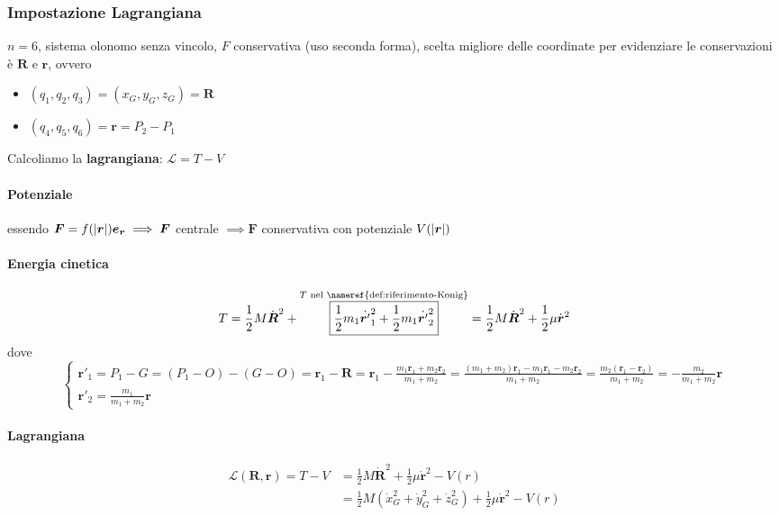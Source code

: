 \documentclass[a4paper,10pt]{article}
\theoremstyle{definition}
\newcommand{\bv}{\boldsymbol} %
\theoremstyle{indentdefinition}
\theoremstyle{indenttheorem}
\theoremstyle{myremark}
\theoremstyle{indentgeneral}
\begin{document}
\subsubsection{Impostazione Lagrangiana}

$n=6$, sistema olonomo senza vincolo, $F$ conservativa (uso seconda forma), scelta migliore delle coordinate per evidenziare le conservazioni è  $\boldsymbol{R}$ e $\boldsymbol{r}$, ovvero
\begin{itemize}
    \item $(q_1,q_2,q_3)=(x_G,y_G,z_G)=\bv{R}$
    \item $(q_4,q_5,q_6)=\bv{r}=P_2-P_1$
\end{itemize}
Calcoliamo la \textbf{lagrangiana}: $\mathcal{L}=T-V$
\paragraph{Potenziale} essendo $\bv{F}=f(\abs{\bv{r}})\bv{e}_{\bv{r}}\implies \bv{F}$
centrale $ \implies\bv{F}$ conservativa con potenziale $V(\abs{\bv{r}})$
\paragraph{Energia cinetica}
\begin{align*}
T & =\frac{1}{2}M\dot{\boldsymbol{R}}^{2}+\overset{\text{\ensuremath{T} nel \nameref{def:riferimento-Konig}}}{\boxed{\frac{1}{2}m_{1}\dot{\boldsymbol{r}'}_{1}^{2}+\frac{1}{2}m_{1}\dot{\boldsymbol{r}'}_{2}^{2}}}=\frac{1}{2}M\dot{\boldsymbol{R}}^{2}+\frac{1}{2}\mu\dot{\boldsymbol{r}}^{2} \\
\end{align*}
dove
$$\begin{cases}
    \boldsymbol{r}'_{1}=P_1-G=\left(P_{1}-O\right)-\left(G-O\right)=\boldsymbol{r}_{1}-\bv{R}=\boldsymbol{r}_{1}-\frac{m_{1}\boldsymbol{r}_{1}+m_{2}\boldsymbol{r}_{2}}{m_{1}+m_{2}}=\frac{(m_{1}+m_{2})\bv{r}_1-m_{1}\boldsymbol{r}_{1}-m_{2}\bv{r}_2}{m_{1}+m_{2}}=\frac{m_2(\bv{r}_1-\bv{r}_2)}{m_{1}+m_{2}}=-\frac{m_{2}}{m_{1}+m_{2}}\boldsymbol{r} \\
    \boldsymbol{r}'_{2}=\frac{m_{1}}{m_{1}+m_{2}}\boldsymbol{r} 
\end{cases}$$


\paragraph{Lagrangiana} 
\begin{align*}
\mathcal{L}(\bv{R},\bv{r}) =T-V&=\frac{1}{2}M\dot{\boldsymbol{R}}^{2}+\frac{1}{2}\mu\dot{\boldsymbol{r}}^{2}-V\left(r\right) \\
&=\frac{1}{2}M(\dot{x}_G^2+\dot{y}_G^2+\dot{z}_G^2)+\frac{1}{2}\mu\dot{\boldsymbol{r}}^{2}-V\left(r\right)
\end{align*}
\end{document}
